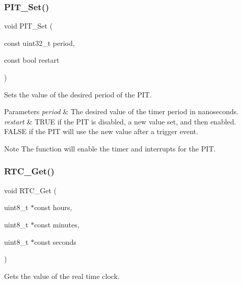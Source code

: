 \subsubsection{\texorpdfstring{P\+I\+T\+\_\+\+Set()}{PIT\_Set()}}
{\footnotesize\ttfamily void P\+I\+T\+\_\+\+Set (\begin{DoxyParamCaption}\item[{const uint32\+\_\+t}]{period,  }\item[{const bool}]{restart }\end{DoxyParamCaption})}



Sets the value of the desired period of the P\+IT. 


\begin{DoxyParams}{Parameters}
{\em period} & The desired value of the timer period in nanoseconds. \\
\hline
{\em restart} & T\+R\+UE if the P\+IT is disabled, a new value set, and then enabled. F\+A\+L\+SE if the P\+IT will use the new value after a trigger event. \\
\hline
\end{DoxyParams}
\begin{DoxyNote}{Note}
The function will enable the timer and interrupts for the P\+IT. 
\end{DoxyNote}
\mbox{\label{group__main__module_ga46e1f15e3b27e2de58d7f213a3bc865d}} 
\subsubsection{\texorpdfstring{R\+T\+C\+\_\+\+Get()}{RTC\_Get()}}
{\footnotesize\ttfamily void R\+T\+C\+\_\+\+Get (\begin{DoxyParamCaption}\item[{uint8\+\_\+t $\ast$const}]{hours,  }\item[{uint8\+\_\+t $\ast$const}]{minutes,  }\item[{uint8\+\_\+t $\ast$const}]{seconds }\end{DoxyParamCaption})}



Gets the value of the real time clock. 


